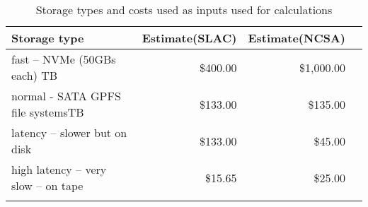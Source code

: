 \tiny \begin{longtable} { |p{}  |r  |r  |r |} 
\caption{Storage types and costs used as inputs used for calculations \label{tab:Storage}}\\ 
\hline 
\textbf{Storage type }&\textbf{Estimate(SLAC)}&\textbf{Estimate(NCSA)} \\ \hline
{fast -- NVMe (50GB\/s each) \/TB  }&{\$400.00}&{\$1,000.00} \\ \hline
{normal - SATA GPFS file systems\/TB  }&{\$133.00}&{\$135.00} \\ \hline
{latency -- slower but on disk }&{\$133.00}&{\$45.00} \\ \hline
{high latency -- very slow -- on tape }&{\$15.65}&{\$25.00} \\ \hline
{}&{}&{} \\ \hline
\end{longtable} \normalsize

